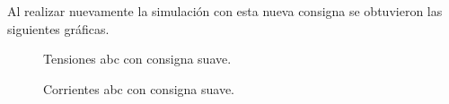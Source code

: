 \documentclass[a4paper, 10pt, onecolumn,journal]{ieeeconf}
\begin{document}
Al realizar nuevamente la simulación con esta nueva consigna se obtuvieron las siguientes gráficas.
\begin{figure}[H]
	\centering
	\begin{adjustbox}{scale=0.5,max width=\columnwidth}
	\end{adjustbox}
	\caption{Tensiones abc con consigna suave.}
	\label{Tensiones abc con consigna suave}
\end{figure}

\begin{figure}[H]
	\centering
	\begin{adjustbox}{scale=0.5,max width=\columnwidth}
	\end{adjustbox}
	\caption{Corrientes abc con consigna suave.}
	\label{Corrientes abc con consigna suave}
\end{figure}
\end{document}
